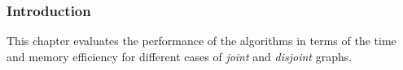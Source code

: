 
\subsubsection{Introduction}
This chapter evaluates the performance of the algorithms in terms of the time and memory efficiency for different cases of \textit{joint} and \textit{disjoint} 
graphs.